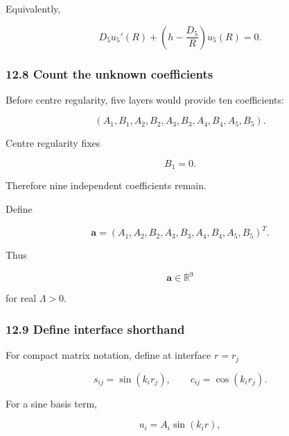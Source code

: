 \documentclass[11pt,a4paper]{article}
\begin{document}
Equivalently,

\begin{equation}
D_5u_5'(R)
+
\left(
h-\frac{D_5}{R}
\right)u_5(R)
=
0.
\tag{TRISO-ML-452}
\label{eq:triso-ml-452}
\end{equation}

\subsubsection*{12.8 Count the unknown coefficients}

Before centre regularity, five layers would provide ten coefficients:

\begin{equation}
(A_1,B_1,A_2,B_2,A_3,B_3,A_4,B_4,A_5,B_5).
\tag{TRISO-ML-453}
\label{eq:triso-ml-453}
\end{equation}

Centre regularity fixes

\begin{equation}
B_1=0.
\tag{TRISO-ML-454}
\label{eq:triso-ml-454}
\end{equation}

Therefore nine independent coefficients remain.

Define

\begin{equation}
\boxed{
\mathbf a
=
(A_1,A_2,B_2,A_3,B_3,A_4,B_4,A_5,B_5)^T.
}
\tag{TRISO-ML-455}
\label{eq:triso-ml-455}
\end{equation}

Thus

\begin{equation}
\mathbf a\in\mathbb R^9
\tag{TRISO-ML-456}
\label{eq:triso-ml-456}
\end{equation}

for real $\Lambda>0$.

\subsubsection*{12.9 Define interface shorthand}

For compact matrix notation, define at interface $r=r_j$

\begin{equation}
s_{ij}=\sin(k_ir_j),
\qquad
c_{ij}=\cos(k_ir_j).
\tag{TRISO-ML-457}
\label{eq:triso-ml-457}
\end{equation}

For a sine basis term,

\begin{equation}
u_i=A_i\sin(k_ir),
\tag{TRISO-ML-458}
\label{eq:triso-ml-458}
\end{equation}
\end{document}
